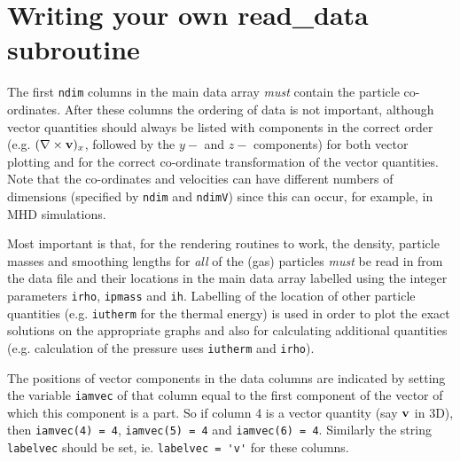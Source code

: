 \documentclass[a4paper,12pt]{article}
\begin{document}
\newpage

\section{Writing your own read\_data subroutine}
\label{sec:writeyourown}
The first \verb+ndim+ columns in the main data array \emph{must} contain the particle co-ordinates.
After these columns the ordering of data is not important, although vector quantities should
always be listed with components in the correct order (e.g. $(\nabla\times {\bf v})_x$,
followed by the $y-$ and $z-$ components) for both vector plotting and for the
correct co-ordinate transformation of the vector quantities. Note that the co-ordinates and velocities can have different
numbers of dimensions (specified by \verb+ndim+ and \verb+ndimV+) since this can occur, for example, in MHD simulations.

Most important is that, for the rendering routines to work, the density, particle
masses and smoothing lengths for \emph{all} of the (gas) particles \emph{must} be read in from
the data file and their locations in the main data array labelled using the integer
parameters \verb+irho+, \verb+ipmass+ and \verb+ih+. Labelling of the location of other particle
quantities (e.g. \verb+iutherm+ for the thermal energy) is used in
order to plot the exact solutions on the appropriate graphs and also for calculating
additional quantities (e.g. calculation of the pressure uses \verb+iutherm+ and
\verb+irho+).

 The positions of vector components in the data columns are indicated by setting the variable \verb+iamvec+ of that
column equal to the first component of the vector of which this component is a part. So if column 4
is a vector quantity (say ${\bf v}$ in 3D), then \verb+iamvec(4) = 4+, \verb+iamvec(5) = 4+ and
\verb+iamvec(6) = 4+. Similarly the string \verb+labelvec+ should be set, ie. \verb+labelvec = 'v'+ for these columns.



\end{document}
